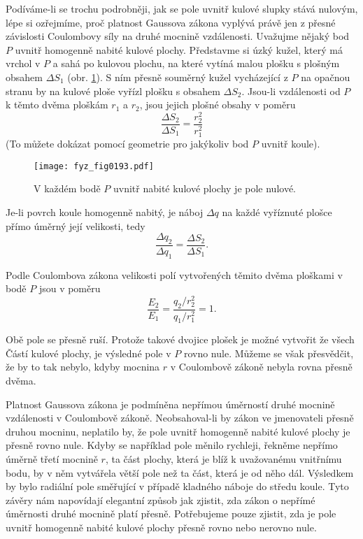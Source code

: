   Podíváme-li se trochu podrobněji, jak se pole uvnitř kulové slupky stává nulovým, lépe si
  ozřejmíme, proč platnost Gaussova zákona vyplývá právě jen z přesné závislosti Coulombovy síly na
  druhé mocnině vzdálenosti. Uvažujme nějaký bod \(P\) uvnitř homogenně nabité kulové plochy.
  Představme si úzký kužel, který má vrchol v \(P\) a sahá po kulovou plochu, na které vytíná malou
  plošku s plošným obsahem \(\Delta S_1\) (obr. \ref{fyz:fig0193}). S ním přesně souměrný kužel
  vycházející z \(P\) na opačnou stranu by na kulové ploše vyřízl plošku s obsahem \(\Delta S_2\).
  Jsou-li vzdálenosti od \(P\) k těmto dvěma ploškám \(r_1\) a \(r_2\), jsou jejich plošné obsahy v
  poměru \[\frac{\Delta S_2}{\Delta S_1} = \frac{r_2^2}{r_1^2}\] (To můžete dokázat pomocí geometrie
  pro jakýkoliv bod \(P\) uvnitř koule).

  \begin{figure}[ht!] %
    \centering
    \texttt{[image: fyz\_fig0193.pdf]}
    \caption{V každém bodě \(P\) uvnitř nabité kulové plochy je pole nulové.}
    \label{fyz:fig0193}
  \end{figure}
  Je-li povrch koule homogenně nabitý, je náboj \(\Delta q\) na každé vyříznuté plošce přímo úměrný
  její velikosti, tedy \[\frac{\Delta q_2}{\Delta q_1} = \frac{\Delta S_2}{\Delta S_1}.\]
  
  Podle Coulombova zákona velikosti polí vytvořených těmito dvěma ploškami v bodě \(P\) jsou v
  poměru \[\frac{E_2}{E_1} = \frac{q_2/r_2^2}{q_1/r_1^2} = 1.\]
  
  Obě pole se přesně ruší. Protože takové dvojice plošek je možné vytvořit že všech Částí kulové
  plochy, je výsledné pole v \(P\) rovno nule. Můžeme se však přesvědčit, že by to tak nebylo, kdyby
  mocnina \(r\) v Coulombově zákoně nebyla rovna přesně dvěma.
  
  Platnost Gaussova zákona je podmíněna nepřímou úměrností druhé mocnině vzdálenosti v Coulombově
  zákoně. Neob\-sahoval-li by zákon ve jmenovateli přesně druhou mocninu, neplatilo by, že pole
  uvnitř homogenně nabité kulové plochy je přesně rovno nule. Kdyby se například pole měnilo
  rychleji, řekněme nepřímo úměrně třetí mocnině \(r\), ta část plochy, která je blíž k uvažovanému
  vnitřnímu bodu, by v něm vytvářela větší pole než ta část, která je od něho dál. Výsledkem by bylo
  radiální pole směřující v případě kladného náboje do středu koule. Tyto závěry nám napovídají
  elegantní způsob jak zjistit, zda zákon o nepřímé úměrnosti druhé mocnině platí přesně.
  Potřebujeme pouze zjistit, zda je pole uvnitř homogenně nabité kulové plochy přesně rovno nebo
  nerovno nule.
  
